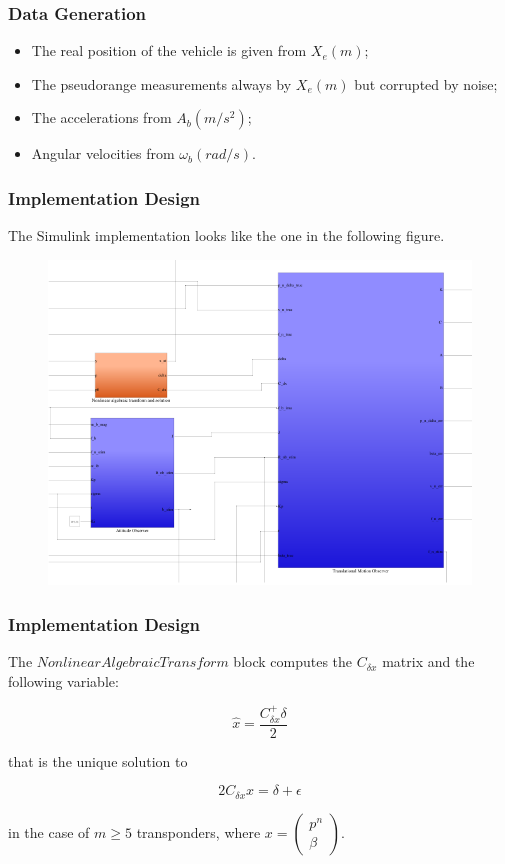 \documentclass{beamer}
\begin{document}
	\begin{frame}
		\frametitle{Data Generation}
		\begin{itemize}
			\item The real position of the vehicle is given from $X_e(m)$;
			\item The pseudorange measurements always by $X_e(m)$ but corrupted by noise;
			\item The accelerations from $A_b(m/s^2)$;
			\item Angular velocities from $\omega_b(rad/s)$.
		\end{itemize}
	\end{frame}
	
	\begin{frame}
		\frametitle{Implementation Design}
		The Simulink implementation looks like the one in the following figure.
		\begin{figure}[H]
			\includegraphics[scale = 0.3]{scheme}
		\end{figure}
	\end{frame}
	
	\begin{frame}
			\frametitle{Implementation Design}
			The $Nonlinear Algebraic Transform$ block computes the $C_{\delta x}$ matrix and the following variable:
			
			\[\hat{x} = \frac {C_{\delta x}^{+} \delta}{2}  \]
			
			that is the unique solution to
			
			\[ 2C_{\delta x} x = \delta + \epsilon \]
			
			in the case of $m \geqslant 5$ transponders, where $x = \begin{pmatrix}
				p^n \\
				\beta
			\end{pmatrix}$.
		\end{frame}
		
\end{document}
